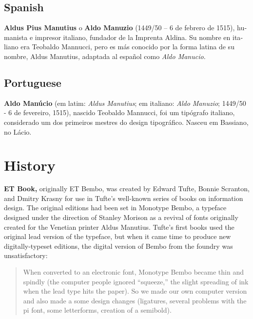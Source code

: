 \documentclass{scrartcl}
\begin{document}
\begin{multicols}{2}
\subsection{Spanish}
\begin{spanish}
\noindent\textbf{Aldus Pius Manutius} o \textbf{Aldo Manuzio} (1449/50 – 6 de febrero de 1515), humanista e impresor italiano, fundador de la Imprenta Aldina. Su nombre en italiano era {\semibold Teobaldo Mannucci,} pero es más conocido por la forma latina de su nombre, Aldus Manutius, adaptada al español como \textit{Aldo Manucio.}
\end{spanish}

\subsection{Portuguese}
\begin{portuges}
\noindent\textbf{Aldo Manúcio} (em latim: \textit{Aldus Manutius}; em italiano: \textit{Aldo Manuzio}; 1449/50 - 6 de fevereiro, 1515), nascido Teobaldo Mannucci, foi um tipógrafo italiano, considerado um dos primeiros mestres do design tipográfico. Nasceu em Bassiano, no Lácio.
\end{portuges}
\end{multicols}

\clearpage

\section{History}

\textbf{ET Book,} originally {\semibold ET Bembo,} was created by Edward Tufte, Bonnie Scranton, and Dmitry Krasny for use in Tufte’s well-known series of books on information design. The original editions had been set in Monotype Bembo, a typeface designed under the direction of Stanley Morison as a revival of fonts originally created for the Venetian printer Aldus Manutius. Tufte’s first books used the original lead version of the typeface, but when it came time to produce new digitally-typeset editions, the digital version of Bembo from the foundry was unsatisfactory:

\begin{quote}
When converted to an electronic font, Monotype Bembo became thin and spindly (the computer people ignored “squeeze,” the slight spreading of ink when the lead type hits the paper). So we made our own computer version and also made a some design changes (ligatures, several problems with the pi font, some letterforms, creation of a semibold).
\end{quote}
\end{document}
